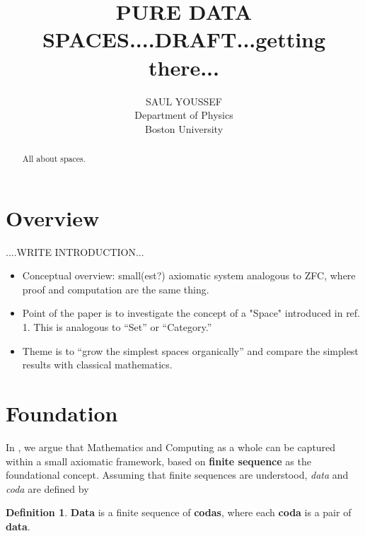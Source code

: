 \documentclass[11pt]{article}
\begin{document}
\title{\bf {PURE DATA SPACES....DRAFT...getting there...}}
\author{%
  SAUL YOUSSEF%
  \hfil \\
  Department of Physics \\
  Boston University \\
}
\maketitle
\begin{abstract}
All about spaces.
\end{abstract}

\theoremstyle{definition}
\newtheorem{axiom}{Axiom}
\newtheorem*{axiom*}{Axiom}
\newtheorem*{fact}{Fact}

\newtheorem{definition}{Definition}

\newtheorem*{remark}{}

\section{Overview}

....WRITE INTRODUCTION...

\begin{itemize}
\item Conceptual overview: small(est?) axiomatic system analogous to ZFC, where proof and computation are the same thing.
\item Point of the paper is to investigate the concept of a "Space" introduced in ref. 1.  This is analogous to ``Set'' or ``Category.''
\item Theme is to ``grow the simplest spaces organically'' and compare the simplest results with classical mathematics. 
\end{itemize}

\section{Foundation}  

In \cite{PDF}, we argue that Mathematics and Computing as a whole can be captured within a small axiomatic framework, 
based on {\bf finite sequence} as the foundational concept.  Assuming that finite sequences are understood, {\it data} and {\it coda} are defined by 

\begin{definition} {{\bf Data} is a finite sequence of {\bf codas}, where each {\bf coda} is a pair of {\bf data}.}
\end{definition}
\end{document}
